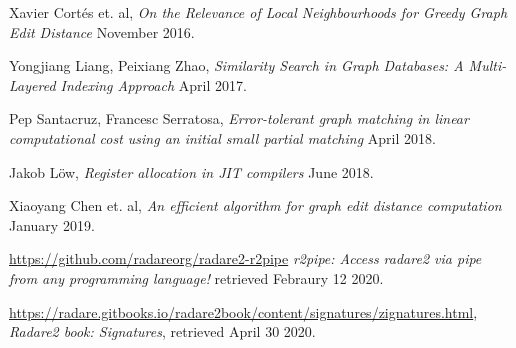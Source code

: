 \documentclass[
    12pt,                               %
    DIV=14,                     %
    parskip=half+,              %
    bigheadings,                %
    cleardoubleempty,   %
    halfparskip,                %
    ]{scrreprt} %
\begin{document}
\begin{thebibliography}{9}
	 Xavier Cortés et. al,
		\textit{On the Relevance of Local Neighbourhoods for Greedy Graph Edit Distance}
		November 2016.
		
	 Yongjiang Liang, Peixiang Zhao,
		\textit{Similarity Search in Graph Databases: A Multi-Layered Indexing Approach}
		April 2017.

	 Pep Santacruz, Francesc Serratosa,
		\textit{Error-tolerant graph matching in linear computational cost using an initial small partial matching}
		April 2018.
		
	 Jakob Löw,
		\textit{Register allocation in JIT compilers}
		June 2018.

	 Xiaoyang Chen et. al,
		\textit{An efficient algorithm for graph edit distance computation}
		January 2019.
		
	 \url{https://github.com/radareorg/radare2-r2pipe}
		\textit{r2pipe: Access radare2 via pipe from any programming language!}
		retrieved Febraury 12 2020.
		
		\url{https://radare.gitbooks.io/radare2book/content/signatures/zignatures.html},
		\textit{Radare2 book: Signatures},
		retrieved April 30 2020.

\end{thebibliography}

\listoffigures
\end{document}

